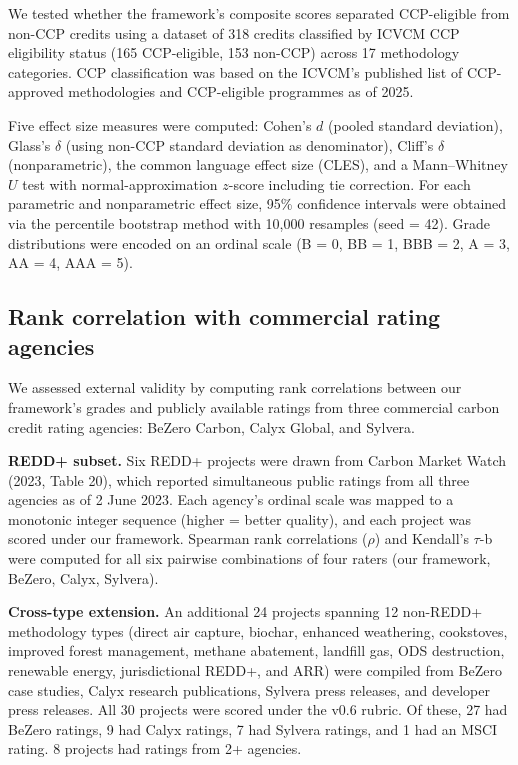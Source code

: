 \documentclass[11pt]{article}
\begin{document}
We tested whether the framework's composite scores separated CCP-eligible from non-CCP credits using a dataset of 318 credits classified by ICVCM CCP eligibility status (165 CCP-eligible, 153 non-CCP) across 17 methodology categories. CCP classification was based on the ICVCM's published list of CCP-approved methodologies and CCP-eligible programmes as of 2025.

Five effect size measures were computed: Cohen's $d$ (pooled standard deviation), Glass's $\delta$ (using non-CCP standard deviation as denominator), Cliff's $\delta$ (nonparametric), the common language effect size (CLES), and a Mann--Whitney $U$ test with normal-approximation $z$-score including tie correction. For each parametric and nonparametric effect size, 95\% confidence intervals were obtained via the percentile bootstrap method with 10,000 resamples (seed = 42). Grade distributions were encoded on an ordinal scale (B = 0, BB = 1, BBB = 2, A = 3, AA = 4, AAA = 5).

\subsection*{Rank correlation with commercial rating agencies}

We assessed external validity by computing rank correlations between our framework's grades and publicly available ratings from three commercial carbon credit rating agencies: BeZero Carbon, Calyx Global, and Sylvera.

\textbf{REDD+ subset.} Six REDD+ projects were drawn from Carbon Market Watch (2023, Table 20), which reported simultaneous public ratings from all three agencies as of 2 June 2023. Each agency's ordinal scale was mapped to a monotonic integer sequence (higher = better quality), and each project was scored under our framework. Spearman rank correlations ($\rho$) and Kendall's $\tau$-b were computed for all six pairwise combinations of four raters (our framework, BeZero, Calyx, Sylvera).

\textbf{Cross-type extension.} An additional 24 projects spanning 12 non-REDD+ methodology types (direct air capture, biochar, enhanced weathering, cookstoves, improved forest management, methane abatement, landfill gas, ODS destruction, renewable energy, jurisdictional REDD+, and ARR) were compiled from BeZero case studies, Calyx research publications, Sylvera press releases, and developer press releases. All 30 projects were scored under the v0.6 rubric. Of these, 27 had BeZero ratings, 9 had Calyx ratings, 7 had Sylvera ratings, and 1 had an MSCI rating. 8 projects had ratings from 2+ agencies.
\end{document}
